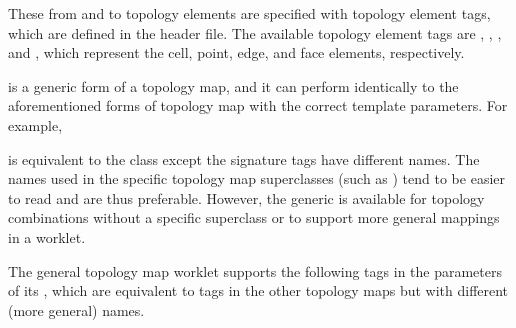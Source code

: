 
These from and to topology elements are specified with topology element
tags, which are defined in the 
header file. The available topology element tags are
, ,
, and , which
represent the cell, point, edge, and face elements, respectively.


 is a generic form of a topology map,
and it can perform identically to the aforementioned forms of topology map
with the correct template parameters. For example,
\begin{quote}
  \textcode{<}%
  \textcode{, }%
  \textcode{>}
\end{quote}
is equivalent to the  class except the
signature tags have different names. The names used in the specific
topology map superclasses (such as )
tend to be easier to read and are thus preferable. However, the generic
 is available for topology combinations
without a specific superclass or to support more general mappings in a
worklet.

The general topology map worklet supports the following tags in the
parameters of its \controlsignature, which are equivalent to tags in the
other topology maps but with different (more general) names.

